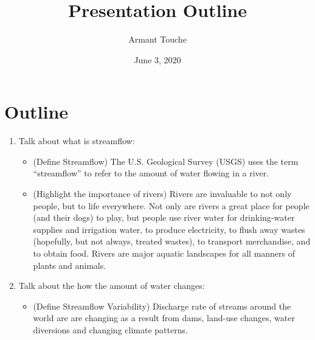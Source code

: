 \documentclass{article}
\begin{document}
\title{\vspace{-2cm}Presentation Outline}
\date{June 3, 2020}
\author{Armant Touche}
\maketitle

\section{Outline}

\begin{enumerate}
    
    \item Talk about what is streamflow:

    \begin{itemize}

        \item (Define Streamflow) The U.S. Geological Survey (USGS) uses the term “streamflow” to refer to the amount of water flowing in a river.
        \item (Highlight the importance of rivers) Rivers are invaluable to not only people, but to life everywhere. Not only are rivers a great place for people (and their dogs) to play, but people use river water for drinking-water supplies and irrigation water, to produce electricity, to flush away wastes (hopefully, but not always, treated wastes), to transport merchandise, and to obtain food. Rivers are major aquatic landscapes for all manners of plants and animals. 

    \end{itemize}

    \item Talk about the how the amount of water changes:

    \begin{itemize}

    \item (Define Streamflow Variability) Discharge rate of streams around the world are are changing as a result from dams, land-use changes, water diversions and changing climate patterns.


\end{itemize}
\end{enumerate}
\end{document}
